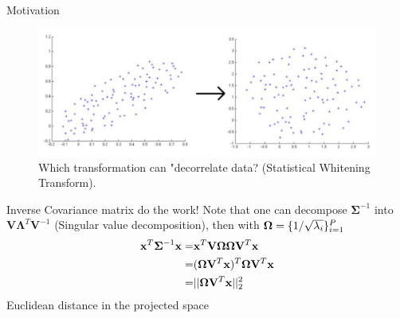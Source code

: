 \documentclass[xcolor=pdftex,dvipsnames,table,mathserif]{beamer}
\begin{document}
\begin{frame}{Motivation}
\begin{figure}
\includegraphics[width=.75\columnwidth]{../graphics/CorrelatedParameters}
\caption{Which transformation can "decorrelate data? (Statistical Whitening Transform).}%
\end{figure}\pause
\alert{Inverse Covariance matrix do the work!}  \pause
Note that one can decompose $\boldsymbol{\Sigma}^{-1}$ into $\mathbf{V} \boldsymbol{\Lambda}^T \mathbf{V} ^{-1}$ (Singular value decomposition), then with $\boldsymbol{\Omega} = \{1 /\sqrt{\lambda_i} \}_{i=1}^{P}$
\begin{eqnarray}
\mathbf{x}^T \boldsymbol{\Sigma}^{-1} \mathbf{x} =&\mathbf{x}^T \mathbf{V} \boldsymbol{\Omega\Omega}\mathbf{V}^{T}\mathbf{x}  \nonumber \\
=&(\boldsymbol{\Omega}\mathbf{V}^T\mathbf{x})^T \boldsymbol{\Omega}\mathbf{V}^{T}\mathbf{x} \nonumber  \\ 
=&||\boldsymbol{\Omega}\mathbf{V}^T\mathbf{x}||_2^2 \label{EqNormInv}
\end{eqnarray} 
\alert{Euclidean distance in the projected space}
\end{frame}
\end{document}
